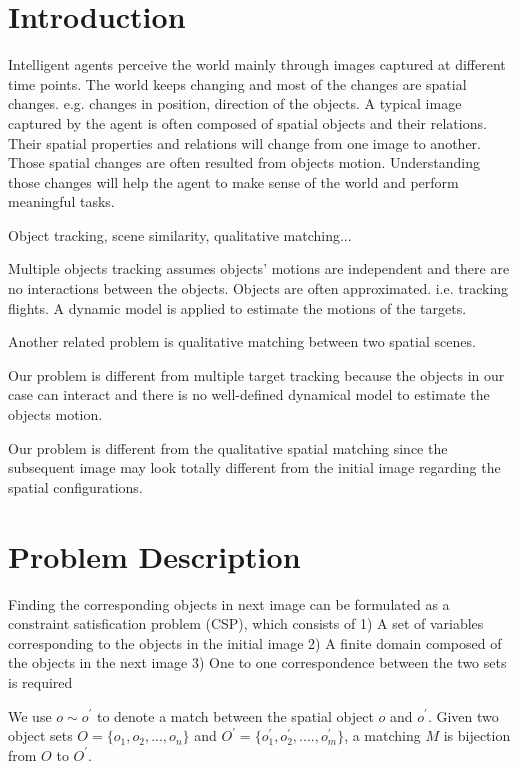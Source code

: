 \documentclass[letterpaper]{article}
\begin{document}
    

\section{Introduction}

Intelligent agents perceive the world mainly through images captured at different time points. The world keeps changing and most of the changes are spatial changes. e.g. changes in position, direction of the objects. A typical image captured by the agent is often composed of spatial objects and their relations. Their spatial properties and relations will change from one image to another. Those spatial changes are often resulted from objects motion.  Understanding those changes will help the agent to make sense of the world and perform meaningful tasks.

Object tracking, scene similarity, qualitative matching... 

Multiple objects tracking assumes objects' motions are independent and there are no interactions between the objects. Objects are often approximated. i.e. tracking  flights. A dynamic model is applied to estimate the motions of the targets.  

Another related problem is qualitative matching between two spatial scenes.\cite{}

Our problem is different from multiple target tracking because the objects in our case can interact and there is no well-defined dynamical model to estimate the objects motion.

Our problem is different from the qualitative spatial matching since the subsequent image may look totally different from the initial image regarding the spatial configurations. 


\section{Problem Description}
Finding the corresponding objects in next image can be formulated as a constraint satisfication problem (CSP), which consists of 
1) A set of variables corresponding to the objects in the initial image
2) A finite domain composed of the objects in the next image
3) One to one correspondence between the two sets is required

We use $o \sim o^{\prime}$ to denote a match between the spatial object $o$ and $o^{\prime}$. 
Given two object sets $O = \{o_1, o_2, ..., o_n\}$ and $O^\prime = \{o^{\prime}_{1}, o^{\prime}_{2}, ...., o^{\prime}_{m}\}$, a matching $M$ is bijection from $O$ to $O^\prime$.
\end{document}
